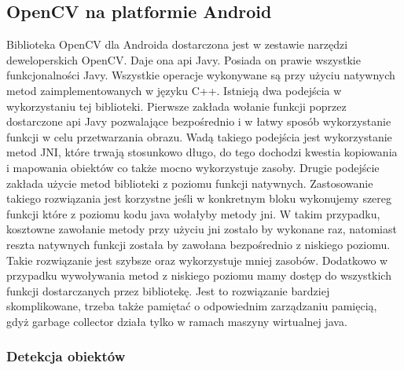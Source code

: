 \subsection{OpenCV na platformie Android}

Biblioteka OpenCV dla Androida dostarczona jest w zestawie narzędzi deweloperskich OpenCV. Daje ona api Javy. Posiada on prawie wszystkie funkcjonalności Javy. Wszystkie operacje wykonywane są przy użyciu natywnych metod zaimplementowanych w języku C++. Istnieją dwa podejścia w wykorzystaniu tej biblioteki. Pierwsze zakłada wołanie funkcji poprzez dostarczone api Javy pozwalające bezpośrednio i w łatwy sposób wykorzystanie funkcji w celu przetwarzania obrazu. Wadą takiego podejścia jest wykorzystanie metod JNI, które trwają stosunkowo długo, do tego dochodzi kwestia kopiowania i mapowania obiektów co także mocno wykorzystuje zasoby. Drugie podejście zakłada użycie metod biblioteki z poziomu funkcji natywnych. Zastosowanie takiego rozwiązania jest korzystne jeśli w konkretnym bloku wykonujemy szereg funkcji które z poziomu kodu java wołałyby metody jni. W takim przypadku, kosztowne zawołanie metody przy użyciu jni zostało by wykonane raz, natomiast reszta natywnych funkcji została by zawołana bezpośrednio z niskiego poziomu. Takie rozwiązanie jest szybsze oraz wykorzystuje mniej zasobów. Dodatkowo w przypadku wywoływania metod z niskiego poziomu mamy dostęp do wszystkich funkcji dostarczanych przez bibliotekę. Jest to rozwiązanie bardziej skomplikowane, trzeba także pamiętać o odpowiednim zarządzaniu pamięcią, gdyż garbage collector działa tylko w ramach maszyny wirtualnej java.

\subsubsection{Detekcja obiektów}

